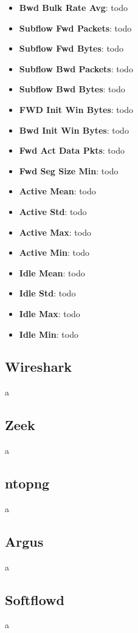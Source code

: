\begin{itemize}
    \item \textbf{Bwd Bulk Rate Avg}: todo
    \item \textbf{Subflow Fwd Packets}: todo
    \item \textbf{Subflow Fwd Bytes}: todo
    \item \textbf{Subflow Bwd Packets}: todo
    \item \textbf{Subflow Bwd Bytes}: todo
    \item \textbf{FWD Init Win Bytes}: todo
    \item \textbf{Bwd Init Win Bytes}: todo
    \item \textbf{Fwd Act Data Pkts}: todo
    \item \textbf{Fwd Seg Size Min}: todo
    \item \textbf{Active Mean}: todo
    \item \textbf{Active Std}: todo
    \item \textbf{Active Max}: todo
    \item \textbf{Active Min}: todo
    \item \textbf{Idle Mean}: todo
    \item \textbf{Idle Std}: todo
    \item \textbf{Idle Max}: todo
    \item \textbf{Idle Min}: todo
\end{itemize}

\subsection{Wireshark}

a

\subsection{Zeek}

a

\subsection{ntopng}

a

\subsection{Argus}

a

\subsection{Softflowd}

a
